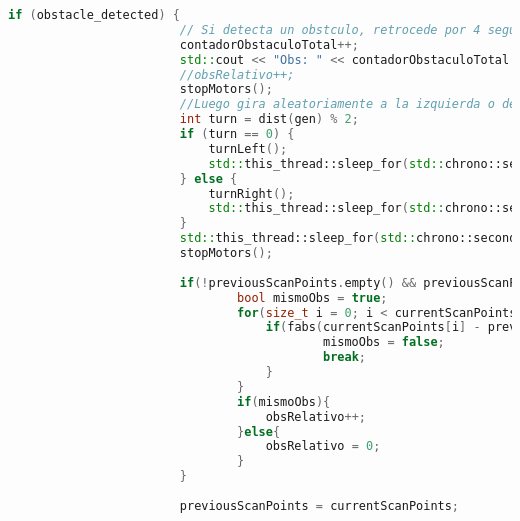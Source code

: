 \begin{lstlisting}[language={C++}, caption={Primer ajuste de c\'odigo}, label={Script}]
                    if (obstacle_detected) {
                        // Si detecta un obstculo, retrocede por 4 segundos
                        contadorObstaculoTotal++;
                        std::cout << "Obs: " << contadorObstaculoTotal << std::endl;
                        //obsRelativo++;
                        stopMotors();
                        //Luego gira aleatoriamente a la izquierda o derecha
                        int turn = dist(gen) % 2;
                        if (turn == 0) {
                            turnLeft();
                            std::this_thread::sleep_for(std::chrono::seconds(5));
                        } else {
                            turnRight();
                            std::this_thread::sleep_for(std::chrono::seconds(5));
                        }
                        std::this_thread::sleep_for(std::chrono::seconds(2));
                        stopMotors();
                        
                        if(!previousScanPoints.empty() && previousScanPoints.size() == currentScanPoints.size()){
                                bool mismoObs = true;
                                for(size_t i = 0; i < currentScanPoints.size(); ++i){
                                    if(fabs(currentScanPoints[i] - previousScanPoints[i]) > 0.05){
                                            mismoObs = false;
                                            break;
                                    }
                                }
                                if(mismoObs){
                                    obsRelativo++;
                                }else{
                                    obsRelativo = 0;
                                }
                        }
                        
                        previousScanPoints = currentScanPoints;
                        

\end{lstlisting}
